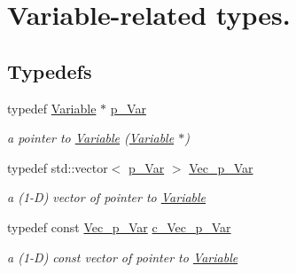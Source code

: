 \hypertarget{group___variable___t_y_p_e_s}{}\section{Variable-\/related types.}
\label{group___variable___t_y_p_e_s}
\subsection*{Typedefs}
\begin{DoxyCompactItemize}
\item 
\mbox{\label{group___variable___t_y_p_e_s_ga85b661f10ca1c046c5f496678213981a}} 
typedef \mbox{\hyperlink{class_s_m_spp__di__unipi__it_1_1_variable}{Variable}} $\ast$ \mbox{\hyperlink{group___variable___t_y_p_e_s_ga85b661f10ca1c046c5f496678213981a}{p\+\_\+\+Var}}
\begin{DoxyCompactList}\small\item\em a pointer to \mbox{\hyperlink{class_s_m_spp__di__unipi__it_1_1_variable}{Variable}} (\mbox{\hyperlink{class_s_m_spp__di__unipi__it_1_1_variable}{Variable}} $\ast$) \end{DoxyCompactList}\item 
\mbox{\label{group___variable___t_y_p_e_s_ga8e4a4bbc570f38e6eea262bc19e2a583}} 
typedef std\+::vector$<$ \mbox{\hyperlink{group___variable___t_y_p_e_s_ga85b661f10ca1c046c5f496678213981a}{p\+\_\+\+Var}} $>$ \mbox{\hyperlink{group___variable___t_y_p_e_s_ga8e4a4bbc570f38e6eea262bc19e2a583}{Vec\+\_\+p\+\_\+\+Var}}
\begin{DoxyCompactList}\small\item\em a (1-\/D) vector of pointer to \mbox{\hyperlink{class_s_m_spp__di__unipi__it_1_1_variable}{Variable}} \end{DoxyCompactList}\item 
\mbox{\label{group___variable___t_y_p_e_s_gac0f024c387d6f879e3f8835d86d44bf5}} 
typedef const \mbox{\hyperlink{group___variable___t_y_p_e_s_ga8e4a4bbc570f38e6eea262bc19e2a583}{Vec\+\_\+p\+\_\+\+Var}} \mbox{\hyperlink{group___variable___t_y_p_e_s_gac0f024c387d6f879e3f8835d86d44bf5}{c\+\_\+\+Vec\+\_\+p\+\_\+\+Var}}
\begin{DoxyCompactList}\small\item\em a (1-\/D) const vector of pointer to \mbox{\hyperlink{class_s_m_spp__di__unipi__it_1_1_variable}{Variable}} \end{DoxyCompactList}\item 

\end{DoxyCompactItemize}
